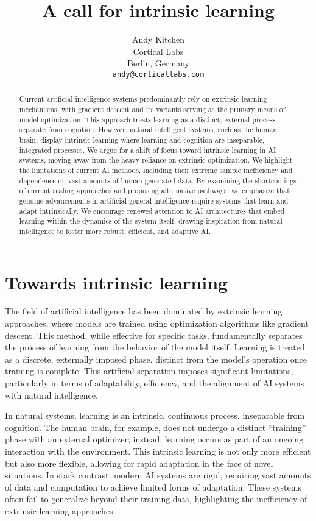 \documentclass{article}
\title{A call for intrinsic learning}
\author{%
  Andy Kitchen\\
  Cortical Labs\\
  Berlin, Germany\\
  \texttt{andy@corticallabs.com}\\
}
\begin{document}
\maketitle


\begin{abstract}
Current artificial intelligence systems predominantly rely on extrinsic
learning mechanisms, with gradient descent and its variants serving as
the primary means of model optimization. This approach treats learning as
a distinct, external process separate from cognition. However, natural
intelligent systems, such as the human brain, display intrinsic learning
where learning and cognition are inseparable, integrated processes.
We argue for a shift of focus toward intrinsic learning in AI
systems, moving away from the heavy reliance on extrinsic optimization. We
highlight the limitations of current AI methods, including their extreme
sample inefficiency and dependence on vast amounts of human-generated
data. By examining the shortcomings of current scaling approaches and
proposing alternative pathways, we emphasize that genuine advancements in
artificial general intelligence require systems that learn and adapt
intrinsically. We encourage renewed attention to AI architectures
that embed learning within the dynamics of the system itself, drawing
inspiration from natural intelligence to foster more robust, efficient,
and adaptive AI.
\end{abstract}


\section{Towards intrinsic learning}

The field of artificial intelligence has been dominated by extrinsic
learning approaches, where models are trained using optimization
algorithms like gradient descent. This method, while effective for
specific tasks, fundamentally separates the process of learning from
the behavior of the model itself. Learning is treated as a discrete,
externally imposed phase, distinct from the model’s operation once
training is complete. This artificial separation imposes significant
limitations, particularly in terms of adaptability, efficiency, and the
alignment of AI systems with natural intelligence.

In natural systems, learning is an intrinsic, continuous process,
inseparable from cognition. The human brain, for example, does not undergo
a distinct ``training'' phase with an external optimizer; instead, learning
occurs as part of an ongoing interaction with the environment. This
intrinsic learning is not only more efficient but also more flexible,
allowing for rapid adaptation in the face of novel situations. In stark
contrast, modern AI systems are rigid, requiring vast amounts of data
and computation to achieve limited forms of adaptation. These systems
often fail to generalize beyond their training data, highlighting the
inefficiency of extrinsic learning approaches.
\end{document}
